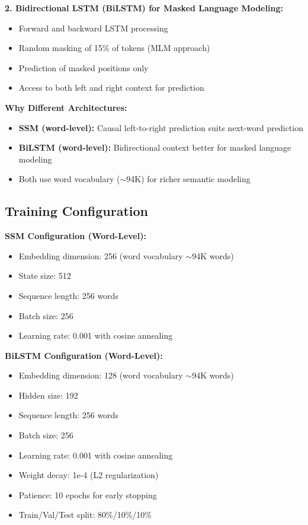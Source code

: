 \documentclass[12pt]{article}
\begin{document}
\textbf{2. Bidirectional LSTM (BiLSTM) for Masked Language Modeling:}
\begin{itemize}
    \item Forward and backward LSTM processing
    \item Random masking of 15\% of tokens (MLM approach)
    \item Prediction of masked positions only
    \item Access to both left and right context for prediction
\end{itemize}

\textbf{Why Different Architectures:}
\begin{itemize}
    \item \textbf{SSM (word-level):} Causal left-to-right prediction suits next-word prediction
    \item \textbf{BiLSTM (word-level):} Bidirectional context better for masked language modeling
    \item Both use word vocabulary ($\sim$94K) for richer semantic modeling
\end{itemize}

\subsection{Training Configuration}

\textbf{SSM Configuration (Word-Level):}
\begin{itemize}
    \item Embedding dimension: 256 (word vocabulary $\sim$94K words)
    \item State size: 512
    \item Sequence length: 256 words
    \item Batch size: 256
    \item Learning rate: 0.001 with cosine annealing
\end{itemize}

\textbf{BiLSTM Configuration (Word-Level):}
\begin{itemize}
    \item Embedding dimension: 128 (word vocabulary $\sim$94K words)
    \item Hidden size: 192
    \item Sequence length: 256 words
    \item Batch size: 256
    \item Learning rate: 0.001 with cosine annealing
    \item Weight decay: 1e-4 (L2 regularization)
    \item Patience: 10 epochs for early stopping
    \item Train/Val/Test split: 80\%/10\%/10\%
\end{itemize}
\end{document}
